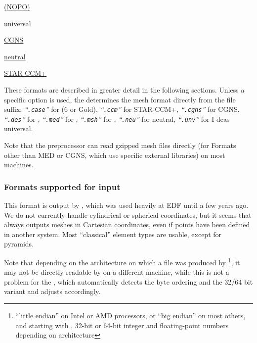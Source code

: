 {{{\begin{list}{-}{}

\item \hyperref[sec:fmtdesc_des]{\simail (NOPO)}
\item \hyperref[sec:fmtdesc_unv]{\ideas universal}
\item \hyperref[sec:fmtdesc_med]{\med}
\item \hyperref[sec:fmtdesc_cgns]{CGNS}
\item \hyperref[sec:fmtdesc_ensight6]{}
\item \hyperref[sec:fmtdesc_ensightg]{\ensightg}
\item \hyperref[sec:fmtdesc_neu]{\gambit neutral}
\item \hyperref[sec:fmtdesc_gmsh]{\gmsh}
\item \hyperref[sec:fmtdesc:ccm]{STAR-CCM+}
\end{list}

These formats are described in greater detail in the following sections.
Unless a specific option is used, the \pcs determines the mesh format directly
from the file suffix: %
{\em``\texttt{.case}''} for \ensight (6 or Gold),
{\em``\texttt{.ccm}''} for STAR-CCM+,
{\em``\texttt{.cgns}''} for CGNS,
{\em``\texttt{.des}''} for \simail,
{\em``\texttt{.med}''} for \med,
{\em``\texttt{.msh}''} for \gmsh,
{\em``\texttt{.neu}''} for \gambit neutral,
{\em``\texttt{.unv}''} for I-deas universal.

Note that the preprocessor can read gzipped mesh files directly (for Formats
other than MED or CGNS, which use specific external libraries) on most machines.

\subsubsection{Formats supported for input\label{sec:formats_in}}


This format is output by \simail, which was used heavily at EDF until
a few years ago. We do not
currently handle cylindrical or spherical coordinates, but it seems that
\simail always outputs meshes in Cartesian coordinates, even if points
have been defined in another system. Most ``classical'' element types
are usable, except for pyramids.

Note that depending on the architecture on which a file was
produced by \simail\footnote{``little endian'' on Intel or AMD processors, or
``big endian'' on most others, and starting with , 32-bit or 64-bit
 integer and floating-point numbers depending on architecture},
it may not be directly readable by \simail on a different machine, while
this is not a problem for the \pcs, which automatically detects the
byte ordering and the 32/64 bit variant and adjusts accordingly.

}}}
